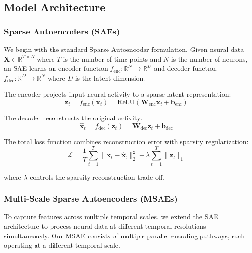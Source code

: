 \subsection{Model Architecture}

\subsubsection{Sparse Autoencoders (SAEs)}

We begin with the standard Sparse Autoencoder formulation. Given neural data $\mathbf{X} \in \mathbb{R}^{T \times N}$ where $T$ is the number of time points and $N$ is the number of neurons, an SAE learns an encoder function $f_{\text{enc}}: \mathbb{R}^N \rightarrow \mathbb{R}^D$ and decoder function $f_{\text{dec}}: \mathbb{R}^D \rightarrow \mathbb{R}^N$ where $D$ is the latent dimension.

The encoder projects input neural activity to a sparse latent representation:
\begin{equation}
\mathbf{z}_t = f_{\text{enc}}(\mathbf{x}_t) = \text{ReLU}(\mathbf{W}_{\text{enc}} \mathbf{x}_t + \mathbf{b}_{\text{enc}})
\end{equation}

The decoder reconstructs the original activity:
\begin{equation}
\hat{\mathbf{x}}_t = f_{\text{dec}}(\mathbf{z}_t) = \mathbf{W}_{\text{dec}} \mathbf{z}_t + \mathbf{b}_{\text{dec}}
\end{equation}

The total loss function combines reconstruction error with sparsity regularization:
\begin{equation}
\mathcal{L} = \frac{1}{T} \sum_{t=1}^{T} \|\mathbf{x}_t - \hat{\mathbf{x}}_t\|_2^2 + \lambda \sum_{t=1}^{T} \|\mathbf{z}_t\|_1
\end{equation}

where $\lambda$ controls the sparsity-reconstruction trade-off.

\subsubsection{Multi-Scale Sparse Autoencoders (MSAEs)}

To capture features across multiple temporal scales, we extend the SAE architecture to process neural data at different temporal resolutions simultaneously. Our MSAE consists of multiple parallel encoding pathways, each operating at a different temporal scale.

